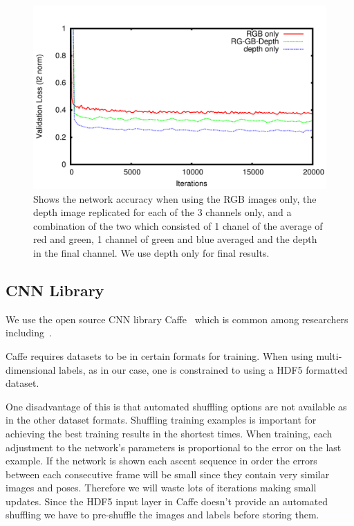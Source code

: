 \documentclass[11pt]{article} %
\begin{document}
\begin{figure}
\centering
\includegraphics*[width=0.8\linewidth,clip]{rgbComp.pdf} %
\caption{Shows the network accuracy when using the RGB images only, the depth image replicated for each of the 3 channels only, and a combination of the two which consisted of 1 chanel of the average of red and green, 1 channel of green and blue averaged and the depth in the final channel. We use depth only for final results. }
\label{fig:rgbdcomp}
\end{figure}





\subsection{CNN Library}

We use the open source CNN library Caffe~\cite{Jia2014} which is common among researchers including~\cite{Chen, Pfister,Girshick2014,Springenberg2015,Schwarz2015,Simonyan2015,Wang2015}. 

Caffe requires datasets to be in certain formats for training. When using multi-dimensional labels, as in our case, one is constrained to using a HDF5 formatted~\cite{Folk2011} dataset. 

One disadvantage of this is that automated shuffling options are not available as in the other dataset formats. Shuffling training examples is important for achieving the best training results in the shortest times. When training, each adjustment to the network's parameters is proportional to the error on the last example. If the network is shown each ascent sequence in order the errors between each consecutive frame will be small since they contain very similar images and poses. Therefore we will waste lots of iterations making small updates. Since the HDF5 input layer in Caffe doesn't provide an automated shuffling we have to pre-shuffle the images and labels before storing them.
\end{document}
